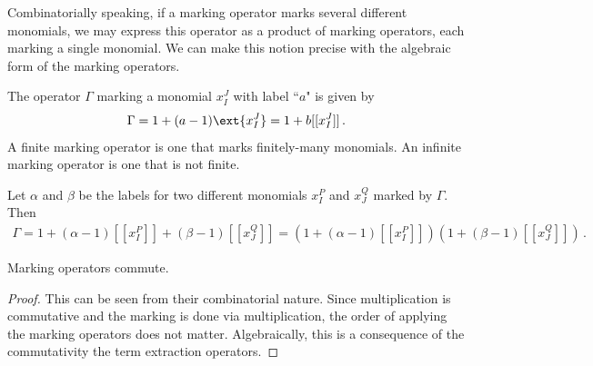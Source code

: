 Combinatorially speaking, if a marking operator marks several different monomials, we may express this operator as a product of marking operators, each marking a single monomial. We can make this notion precise with the algebraic form of the marking operators.
\begin{definition} The operator $\Gamma$ marking a monomial $x_I^J$ with label ``$a$" is given by
\begin{align}
	\Gamma = 1  +(a-1)\ext{x_I^J} = 1 + b[[x_I^J]]\,.
\end{align}
A finite marking operator is one that marks finitely-many monomials. An infinite marking operator is one that is not finite.
\end{definition}
\begin{lemma} Let $\alpha$ and $\beta$ be the labels for two different monomials $x_I^P$ and $x_J^Q$ marked by $\Gamma$. Then
\begin{align}
	\Gamma = 1 + (\alpha-1)[[x_I^P]]+(\beta-1)[[x_J^Q]] = (1+ (\alpha-1)[[x_I^P]])(1+ (\beta-1)[[x_J^Q]])\,.
\end{align}
\end{lemma}
\begin{corollary} Marking operators commute.
\end{corollary}
\begin{proof} This can be seen from their combinatorial nature. Since multiplication is commutative and the marking is done via multiplication, the order of applying the marking operators does not matter. Algebraically, this is a consequence of the commutativity the term extraction operators.
\end{proof}

